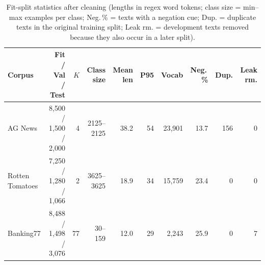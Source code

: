\begin{table}[H]
\centering
\footnotesize
\caption{Fit-split statistics after cleaning (lengths in regex word tokens; class size = min--max examples per class; Neg.\,\% = texts with a negation cue; Dup. = duplicate texts in the original training split; Leak rm. = development texts removed because they also occur in a later split).}\label{tab:eda}
\begin{tabular}{@{}lrrrrrrrrr@{}}
\toprule
Corpus & Fit / Val / Test & $K$ & Class size & Mean len & P95 & Vocab & Neg.\,\% & Dup. & Leak rm. \\
\midrule
AG News & 8,500 / 1,500 / 2,000 & 4 & 2125--2125 & 38.2 & 54 & 23,901 & 13.7 & 156 & 0 \\
Rotten Tomatoes & 7,250 / 1,280 / 1,066 & 2 & 3625--3625 & 18.9 & 34 & 15,759 & 23.4 & 0 & 0 \\
Banking77 & 8,488 / 1,498 / 3,076 & 77 & 30--159 & 12.0 & 29 & 2,243 & 25.9 & 0 & 7 \\
\bottomrule
\end{tabular}
\end{table}
